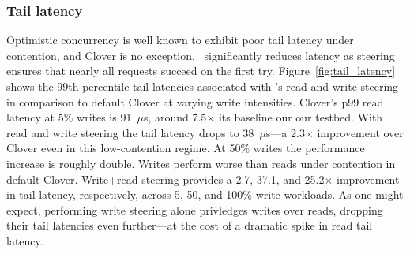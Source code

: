 \subsubsection{Tail latency}

Optimistic concurrency is well known to exhibit poor tail latency
under contention, and Clover is no exception.  \sword\ significantly
reduces latency as steering ensures that nearly all requests succeed
on the first try.
%
Figure~\ref{fig:tail_latency} shows the 99th-percentile tail latencies
associated with \sword's read and write steering in comparison to
default Clover at varying write intensities. Clover's p99 read latency
at 5\% writes is 91~$\mu$s, around 7.5$\times$ its
baseline our our testbed. With read and write steering the tail
latency drops to 38~$\mu$s---a 2.3$\times$ improvement over
Clover even in this low-contention regime. At 50\% writes the
performance increase is roughly double.
%
%
Writes perform
worse than reads under contention in default Clover. Write+read
steering provides a 2.7, 37.1, and 25.2$\times$
improvement in tail latency, respectively, across 5, 50, and 100\%
write workloads.  As one might expect, performing write steering alone
privledges writes over reads, dropping their tail latencies even
further---at the cost of a dramatic
spike in read tail latency.

